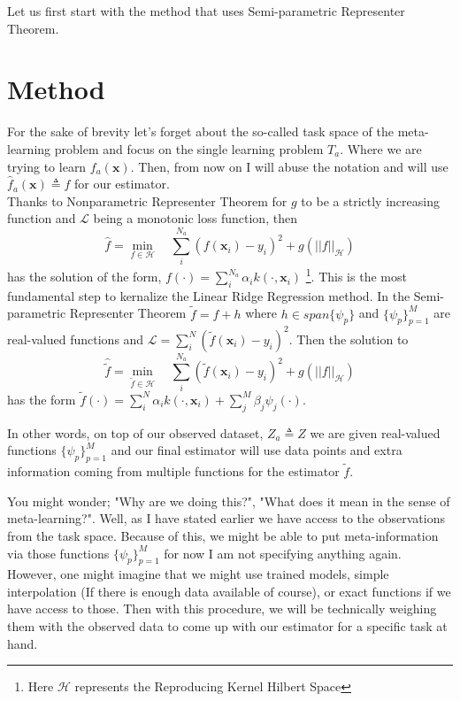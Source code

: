 \documentclass{tran-l}
\theoremstyle{definition}
\theoremstyle{remark}
\numberwithin{equation}{section}
\begin{document}
Let us first start with the method that uses Semi-parametric Representer Theorem. 

\section{Method}

\rem For the sake of brevity let's forget about the so-called task space of the meta-learning problem and focus on the single learning problem $T_a$. Where we are trying to learn $f_a(\mathbf{x})$. Then, from now on I will abuse the notation and will use $\hat{f}_a(\mathbf{x})\triangleq f $ for our estimator. \\

Thanks to Nonparametric Representer Theorem for $g$ to be a strictly increasing function and $\mathcal{L}$ being a monotonic loss function, then 
\begin{equation}
  \hat{f} = \min_{f\in\mathcal{H}}\quad \sum_i^{N_a}(f(\mathbf{x}_i)-y_i)^2 + g(||f||_\mathcal{H})
\end{equation} 
has the solution of the form, $f(\cdot)=\sum^{N_a}_i\alpha_i k(\cdot,\mathbf{x}_i)$ \footnote{Here $\mathcal{H}$ represents the Reproducing Kernel Hilbert Space}. This is the most fundamental step to kernalize the Linear Ridge Regression method.
In the Semi-parametric Representer Theorem  $\tilde{f}= f + h$ where $h\in span\{\psi_p\}$ and $\{\psi_p\}_{p=1}^M$ are real-valued functions and $\mathcal{L}=\sum_i^N(\tilde{f}(\mathbf{x}_i)-y_i)^2$. Then the solution to 
\begin{equation}
\hat{\tilde{f}} = \min_{\tilde{f}\in\mathcal{H}}\quad\sum_i^{N_a}(\tilde{f}(\mathbf{x}_i)-y_i)^2 + g(||f||_\mathcal{H})
\end{equation}  
has the form $\tilde{f}(\cdot)=\sum^N_i\alpha_i k(\cdot,\mathbf{x}_i)+\sum_j^M\beta_j\psi_j(\cdot).$

In other words, on top of our observed dataset, $Z_a\triangleq Z$ we are given real-valued functions $\{\psi_p\}_{p=1}^M$ and our final estimator will use data points and extra information coming from multiple functions for the estimator $\tilde{f}$. 

\rem  You might wonder; "Why are we doing this?",  "What does it mean in the sense of meta-learning?". Well, as I have stated earlier we have access to the observations from the task space. Because of this, we might be able to put meta-information via those functions $\{\psi_p\}_{p=1}^M$ for now I am not specifying anything again. However, one might imagine that we might use trained models, simple interpolation (If there is enough data available of course), or exact functions if we have access to those. Then with this procedure, we will be technically weighing them with the observed data to come up with our estimator for a specific task at hand.
\end{document}
